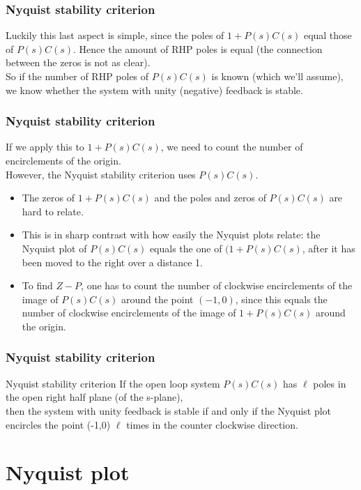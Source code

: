 \begin{frame}
	\frametitle{Nyquist stability criterion}
	\vspace{-10ex}
	Luckily this last aspect is simple, since the poles of $1+P(s)C(s)$ equal those of $P(s)C(s)$. Hence the amount of RHP poles is equal (the connection between the zeros is not as clear).\\
	\bigskip
	So if the number of RHP poles of $P(s)C(s)$ is known (which we'll assume), we know whether the system with unity (negative) feedback is stable.
\end{frame}

\begin{frame}
	\frametitle{Nyquist stability criterion}
	If we apply this to $1+P(s)C(s)$, we need to count the number of encirclements of the origin.\\
	However, the Nyquist stability criterion uses $P(s)C(s)$.
	\begin{itemize}
		\item The zeros of $1+P(s)C(s)$ and the poles and zeros of $P(s)C(s)$ are hard to relate.
		\item This is in sharp contrast with how easily the Nyquist plots relate: the Nyquist plot of $P(s)C(s)$ equals the one of $(1+P(s)C(s)$, after it has been moved to the right over a distance 1.
		\item To find $Z-P$, one has to count the number of clockwise encirclements of the image of $P(s)C(s)$ around the point $(-1,0)$, since this equals the number of clockwise encirclements of the image of $1+P(s)C(s)$ around the origin.
	\end{itemize}
\end{frame}

\begin{frame}
	\frametitle{Nyquist stability criterion}
	\begin{block}{Nyquist stability criterion}
		If the open loop system $P(s)C(s)$ has $\ell$ poles in the open right half plane (of the s-plane),\\
		then the system with unity feedback is stable if and only if the Nyquist plot encircles the point (-1,0) $\ell$ times in the counter clockwise direction.
	\end{block}
\end{frame}

\section{Nyquist plot}

